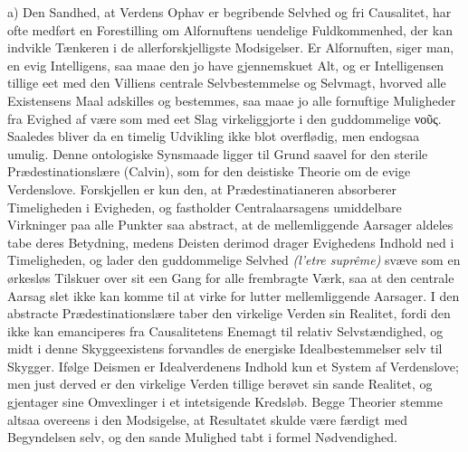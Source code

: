 \documentclass[12pt]{book}
\newcommand{\opage}[1]{\marginnote{\footnotesize\textit{[#1]}}}
\begin{document}
a) Den Sandhed, at Verdens Ophav er begribende Selvhed og fri Causalitet, har ofte medført
en Forestilling om Alfornuftens uendelige Fuldkommenhed, der kan indvikle Tænkeren i de
allerforskjelligste Modsigelser. Er Alfornuften, siger man, en evig Intelligens, saa maae
den jo have gjennemskuet Alt, og er Intelligensen tillige eet med den Villiens centrale
Selvbestemmelse og Selvmagt, hvorved alle Existensens Maal adskilles og bestemmes, saa
maae jo alle fornuftige Muligheder fra Evighed af være som med eet Slag virkeliggjorte i
den guddommelige νοῦς. Saaledes bliver da en timelig Udvikling ikke blot overflødig, men
endogsaa umulig.
\opage{200} %
Denne ontologiske Synsmaade ligger til Grund saavel for den sterile Prædestinationslære
(Calvin), som for den deistiske Theorie om de evige Verdenslove. Forskjellen er kun den,
at Prædestinatianeren absorberer Timeligheden i Evigheden, og fastholder Centralaarsagens
umiddelbare Virkninger paa alle Punkter saa abstract, at de mellemliggende Aarsager aldeles
tabe deres Betydning, medens Deisten derimod drager Evighedens Indhold ned i Timeligheden,
og lader den guddommelige Selvhed \textit{(l’etre suprême)} svæve som en ørkesløs Tilskuer
over sit een Gang for alle frembragte Værk, saa at den centrale Aarsag slet ikke kan komme
til at virke for lutter mellemliggende Aarsager. I den abstracte Prædestinationslære taber
den virkelige Verden sin Realitet, fordi den ikke kan emanciperes fra Causalitetens
Enemagt til relativ Selvstændighed, og midt i denne Skyggeexistens forvandles de energiske
Idealbestemmelser selv til Skygger. Ifølge Deismen er Idealverdenens Indhold kun et System
af Verdenslove; men just derved er den virkelige Verden tillige berøvet sin sande
Realitet, og gjentager sine Omvexlinger i et intetsigende Kredsløb. Begge Theorier stemme
altsaa overeens i den Modsigelse, at Resultatet skulde være færdigt med Begyndelsen selv,
og den sande Mulighed tabt i formel Nødvendighed.
\end{document}
